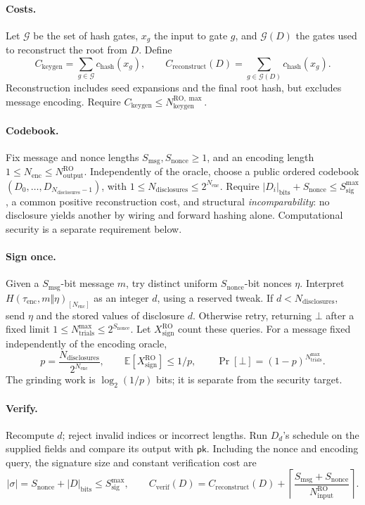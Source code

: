 \documentclass[10pt]{article}
\newcommand{\roinput}{N_{\mathrm{input}}^{\mathrm{RO}}}
\newcommand{\rooutput}{N_{\mathrm{output}}^{\mathrm{RO}}}
\newcommand{\keybudget}{N_{\mathrm{keygen}}^{\mathrm{RO},\max}}
\newcommand{\sigbudget}{S_{\mathrm{sig}}^{\max}}
\newcommand{\messagesize}{S_{\mathrm{msg}}}
\newcommand{\noncesize}{S_{\mathrm{nonce}}}
\newcommand{\encbits}{N_{\mathrm{enc}}}
\newcommand{\disclosurecount}{N_{\mathrm{disclosures}}}
\newcommand{\hashcost}{c_{\mathrm{hash}}}
\newcommand{\reconstructcost}{C_{\mathrm{reconstruct}}}
\begin{document}
\paragraph{Costs.} Let $\mathcal G$ be the set of hash gates, $x_g$ the input to gate $g$, and $\mathcal G(D)$ the gates used to reconstruct the root from $D$. Define
\[
 C_{\mathrm{keygen}}=\sum_{g\in\mathcal G}\hashcost(x_g),\qquad \reconstructcost(D)=\sum_{g\in\mathcal G(D)}\hashcost(x_g).
\]
Reconstruction includes seed expansions and the final root hash, but excludes message encoding. Require $C_{\mathrm{keygen}}\le\keybudget$.

\paragraph{Codebook.} Fix message and nonce lengths $\messagesize,\noncesize\ge1$, and an encoding length $1\le\encbits\le\rooutput$. Independently of the oracle, choose a public ordered codebook $(D_0,\ldots,D_{\disclosurecount-1})$, with $1\le\disclosurecount\le2^{\encbits}$. Require $|D_i|_{\mathrm{bits}}+\noncesize\le\sigbudget$, a common positive reconstruction cost, and structural \emph{incomparability}: no disclosure yields another by wiring and forward hashing alone. Computational security is a separate requirement below.

\paragraph{Sign once.} Given a $\messagesize$-bit message $m$, try distinct uniform $\noncesize$-bit nonces $\eta$. Interpret $H(\tau_{\mathrm{enc}},m\Vert\eta)_{[\encbits]}$ as an integer $d$, using a reserved tweak. If $d<\disclosurecount$, send $\eta$ and the stored values of disclosure $d$. Otherwise retry, returning $\bot$ after a fixed limit $1\le N_{\mathrm{trials}}^{\max}\le2^{\noncesize}$. Let $X_{\mathrm{sign}}^{\mathrm{RO}}$ count these queries. For a message fixed independently of the encoding oracle,
\[
 p=\frac{\disclosurecount}{2^{\encbits}},\qquad \mathbb E[X_{\mathrm{sign}}^{\mathrm{RO}}]\le1/p,\qquad \Pr[\bot]=(1-p)^{N_{\mathrm{trials}}^{\max}}.
\]
The grinding work is $\log_2(1/p)$ bits; it is separate from the security target.
\paragraph{Verify.} Recompute $d$; reject invalid indices or incorrect lengths. Run $D_d$'s schedule on the supplied fields and compare its output with $\mathsf{pk}$. Including the nonce and encoding query, the signature size and constant verification cost are
\[
 |\sigma|=\noncesize+|D|_{\mathrm{bits}}\le\sigbudget,\qquad C_{\mathrm{verif}}(D)=\reconstructcost(D)+\left\lceil\frac{\messagesize+\noncesize}{\roinput}\right\rceil.
\]
\end{document}
